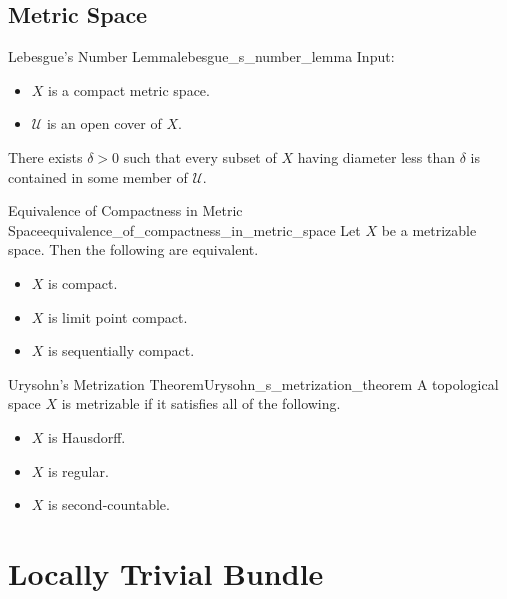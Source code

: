 \documentclass{article}
\begin{document}
\subsection{Metric Space}

\begin{lemma}{Lebesgue's Number Lemma}{lebesgue_s_number_lemma}
    Input:
    \begin{itemize}
        \item $X$ is a compact metric space.
        \item $\mathcal{U}$ is an open cover of $X$.
    \end{itemize}
    There exists $\delta > 0$ such that every subset of $X$ having diameter less than $\delta$ is contained in some member of $\mathcal{U}$.
\end{lemma}

\begin{theorem}{Equivalence of Compactness in Metric Space}{equivalence_of_compactness_in_metric_space}
    Let $X$ be a metrizable space.
    Then the following are equivalent.
    \begin{itemize}
        \item $X$ is compact.
        \item $X$ is limit point compact.
        \item $X$ is sequentially compact.
    \end{itemize}
\end{theorem}

\begin{theorem}{Urysohn's Metrization Theorem}{Urysohn_s_metrization_theorem}
    A topological space $X$ is metrizable if it satisfies all of the following.
    \begin{itemize}
        \item $X$ is Hausdorff.
        \item $X$ is regular.
        \item $X$ is second-countable.
    \end{itemize}
\end{theorem}

\section{Locally Trivial Bundle}
\end{document}
